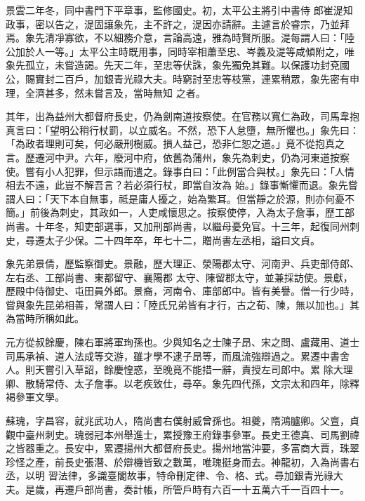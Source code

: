 \begin{pinyinscope}
 景雲二年冬，同中書門下平章事，監修國史。初，太平公主將引中書侍
 郎崔湜知政事，密以告之，湜固讓象先，主不許之，湜因亦請辭。主遽言於睿宗，乃並拜焉。象先清凈寡欲，不以細務介意，言論高遠，雅為時賢所服。湜每謂人曰：「陸公加於人一等。」太平公主時既用事，同時宰相蕭至忠、岑義及湜等咸傾附之，唯象先孤立，未嘗造謁。先天二年，至忠等伏誅，象先獨免其難。以保護功封兗國公，賜實封二百戶，加銀青光祿大夫。時窮討至忠等枝黨，連累稍眾，象先密有申理，全濟甚多，然未嘗言及，當時無知
 之者。



 其年，出為益州大都督府長史，仍為劍南道按察使。在官務以寬仁為政，司馬韋抱真言曰：「望明公稍行杖罰，以立威名。不然，恐下人怠墮，無所懼也。」象先曰：「為政者理則可矣，何必嚴刑樹威。損人益己，恐非仁恕之道。」竟不從抱真之言。歷遷河中尹。六年，廢河中府，依舊為蒲州，象先為刺史，仍為河東道按察使。嘗有小人犯罪，但示語而遣之。錄事白曰：「此例當合與杖。」象先曰：「人情相去不遠，此豈不解吾言？若必須行杖，即當自汝為
 始。」錄事慚懼而退。象先嘗謂人曰：「天下本自無事，祗是庸人擾之，始為繁耳。但當靜之於源，則亦何憂不簡。」前後為刺史，其政如一，人吏咸懷思之。按察使停，入為太子詹事，歷工部尚書。十年冬，知吏部選事，又加刑部尚書，以繼母憂免官。十三年，起復同州刺史，尋遷太子少保。二十四年卒，年七十二，贈尚書左丞相，謚曰文貞。



 象先弟景倩，歷監察御史。景融，歷大理正、滎陽郡太守、河南尹、兵吏部侍郎、左右丞、工部尚書、東都留守、襄陽郡
 太守、陳留郡太守，並兼採訪使。景獻，歷殿中侍御史、屯田員外郎。景裔，河南令、庫部郎中。皆有美譽。僧一行少時，嘗與象先昆弟相善，常謂人曰：「陸氏兄弟皆有才行，古之荀、陳，無以加也。」其為當時所稱如此。



 元方從叔餘慶，陳右軍將軍珣孫也。少與知名之士陳子昂、宋之問、盧藏用、道士司馬承禎、道人法成等交游，雖才學不逮子昂等，而風流強辯過之。累遷中書舍人。則天嘗引入草詔，餘慶惶惑，至晚竟不能措一辭，責授左司郎中。累
 除大理卿、散騎常侍、太子詹事。以老疾致仕，尋卒。象先四代孫，文宗太和四年，除釋褐參軍文學。



 蘇瑰，字昌容，就兆武功人，隋尚書右僕射威曾孫也。祖夔，隋鴻臚卿。父亶，貞觀中臺州刺史。瑰弱冠本州舉進士，累授豫王府錄事參軍。長史王德真、司馬劉禕之皆器重之。長安中，累遷揚州大都督府長史。揚州地當沖要，多富商大賈，珠翠珍怪之產，前長史張潛、於辯機皆致之數萬，唯瑰挺身而去。神龍初，入為尚書右丞，以明
 習法律，多識臺閣故事，特命刪定律、令、格、式。尋加銀青光祿大夫。是歲，再遷戶部尚書，奏計帳，所管戶時有六百一十五萬六千一百四十一。




\end{pinyinscope}
